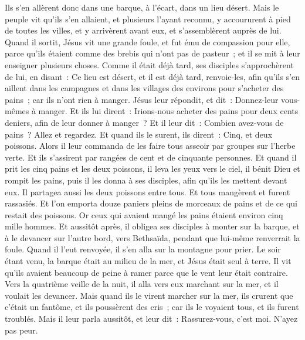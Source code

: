 \begin{multicols}{2}
Ils s'en allèrent donc dans une barque, à l'écart, dans un lieu désert.
Mais le peuple vit qu'ils s'en allaient, et plusieurs l'ayant reconnu, y accoururent à pied de toutes les villes, et y arrivèrent avant eux, et s'assemblèrent auprès de lui.
Quand il sortit, Jésus vit une grande foule, et fut ému de compassion pour elle, parce qu'ils étaient comme des brebis qui n'ont pas de pasteur~; et il se mit à leur enseigner plusieurs choses.
Comme il était déjà tard, ses disciples s'approchèrent de lui, en disant~: Ce lieu est désert, et il est déjà tard,
renvoie-les, afin qu'ils s'en aillent dans les campagnes et dans les villages des environs pour s'acheter des pains~; car ils n'ont rien à manger.
Jésus leur répondit, et dit~: Donnez-leur vous-mêmes à manger. Et ils lui dirent~: Irions-nous acheter des pains pour deux cents deniers, afin de leur donner à manger~?
Et il leur dit~: Combien avez-vous de pains~? Allez et regardez. Et quand ils le surent, ils dirent~: Cinq, et deux poissons.
Alors il leur commanda de les faire tous asseoir par groupes sur l'herbe verte.
Et ils s'assirent par rangées de cent et de cinquante personnes.
Et quand il prit les cinq pains et les deux poissons, il leva les yeux vers le ciel, il bénit Dieu et rompit les pains, puis il les donna à ses disciples, afin qu'ils les mettent devant eux. Il partagea aussi les deux poissons entre tous.
Et tous mangèrent et furent rassasiés.
Et l'on emporta douze paniers pleins de morceaux de pains et de ce qui restait des poissons.
Or ceux qui avaient mangé les pains étaient environ cinq mille hommes.
Et aussitôt après, il obligea ses disciples à monter sur la barque, et à le devancer sur l'autre bord, vers Bethsaïda, pendant que lui-même renverrait la foule.
Quand il l'eut renvoyée, il s'en alla sur la montagne pour prier.
Le soir étant venu, la barque était au milieu de la mer, et Jésus était seul à terre.
Il vit qu'ils avaient beaucoup de peine à ramer parce que le vent leur était contraire. Vers la quatrième veille de la nuit, il alla vers eux marchant sur la mer, et il voulait les devancer.
Mais quand ils le virent marcher sur la mer, ils crurent que c'était un fantôme, et ils poussèrent des cris~;
car ils le voyaient tous, et ils furent troublés. Mais il leur parla aussitôt, et leur dit~: Rassurez-vous, c'est moi. N'ayez pas peur.

\end{multicols}
